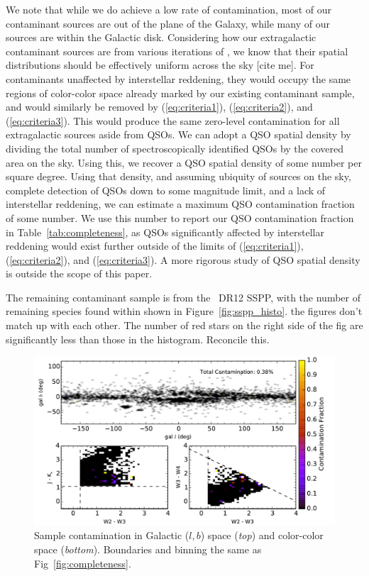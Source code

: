 We note that while we do achieve a low rate of contamination, most of our contaminant sources are out of the plane of the Galaxy, while many of our \agb\, sources are within the Galactic disk. Considering how our extragalactic contaminant sources are from various iterations of \sdss, we know that their spatial distributions should be effectively uniform across the sky {\color{red} [cite me]}. For contaminants unaffected by interstellar reddening, they would occupy the same regions of color-color space already marked by our existing contaminant sample, and would similarly be removed by (\ref{eq:criteria1}), (\ref{eq:criteria2}), and (\ref{eq:criteria3}). This would produce the same zero-level contamination for all extragalactic sources aside from QSOs. We can adopt a QSO spatial density by dividing the total number of spectroscopically identified QSOs by the covered area on the sky. Using this, we recover a QSO spatial density of {\color{red} some number per square degree}. Using that density, and assuming ubiquity of sources on the sky, complete detection of QSOs {\color{red} down to some magnitude limit}, and a lack of interstellar reddening, we can estimate a maximum QSO contamination fraction of {\color{red} some number}. We use this number to report our QSO contamination fraction in Table~\ref{tab:completeness}, as QSOs significantly affected by interstellar reddening would exist further outside of the limits of (\ref{eq:criteria1}), (\ref{eq:criteria2}), and (\ref{eq:criteria3}). A more rigorous study of QSO spatial density is outside the scope of this paper.

The remaining contaminant sample is from the \sdss\, DR12 SSPP, with the number of remaining species found within shown in Figure~\ref{fig:sspp_histo}. {\color{red} the figures don't match up with each other. The number of red stars on the right side of the fig are significantly less than those in the histogram. Reconcile this.}

\begin{figure}[h]
\includegraphics[width=6.7in]{figs/contamination_map.pdf}
\caption{Sample contamination in Galactic ($l,b$) space (\emph{top}) and color-color space (\emph{bottom}). Boundaries and binning the same as Fig~\ref{fig:completeness}.\label{fig:contamination}}
\end{figure}

